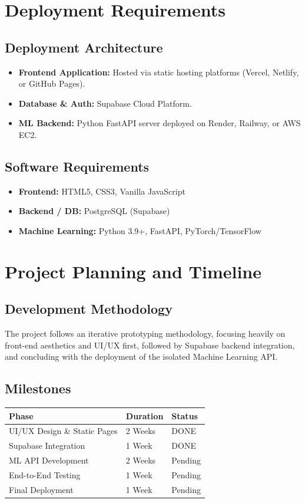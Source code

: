 \documentclass[12pt,a4paper]{article}
\begin{document}
\section{Deployment Requirements}

\subsection{Deployment Architecture}
\begin{itemize}
    \item \textbf{Frontend Application:} Hosted via static hosting platforms (Vercel, Netlify, or GitHub Pages).
    \item \textbf{Database \& Auth:} Supabase Cloud Platform.
    \item \textbf{ML Backend:} Python FastAPI server deployed on Render, Railway, or AWS EC2.
\end{itemize}

\subsection{Software Requirements}
\begin{itemize}
    \item \textbf{Frontend:} HTML5, CSS3, Vanilla JavaScript
    \item \textbf{Backend / DB:} PostgreSQL (Supabase)
    \item \textbf{Machine Learning:} Python 3.9+, FastAPI, PyTorch/TensorFlow
\end{itemize}

\section{Project Planning and Timeline}

\subsection{Development Methodology}
The project follows an iterative prototyping methodology, focusing heavily on front-end aesthetics and UI/UX first, followed by Supabase backend integration, and concluding with the deployment of the isolated Machine Learning API.

\subsection{Milestones}
\begin{longtable}{|p{5cm}|p{4cm}|p{3cm}|}
\hline
\textbf{Phase} & \textbf{Duration} & \textbf{Status} \\
\hline
UI/UX Design \& Static Pages & 2 Weeks & DONE \\
\hline
Supabase Integration & 1 Week & DONE \\
\hline
ML API Development & 2 Weeks & Pending \\
\hline
End-to-End Testing & 1 Week & Pending \\
\hline
Final Deployment & 1 Week & Pending \\
\hline
\end{longtable}
\end{document}
